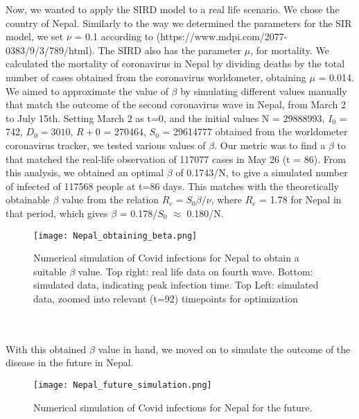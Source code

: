 \documentclass[11pt]{article}
\theoremstyle{definition}
\begin{document}
{Now, we wanted to apply the SIRD model to a real life scenario. We chose the country of Nepal. Similarly to the way we determined the parameters for the SIR model, we set $\nu$ = 0.1 according to (https://www.mdpi.com/2077-0383/9/3/789/html). The SIRD also has the parameter $\mu$, for mortality. We calculated the mortality of coronavirus in Nepal by dividing deaths by the total number of cases obtained from the coronavirus worldometer, obtaining $\mu$ = 0.014. We aimed to approximate the value of $\beta$ by simulating different values manually that match the outcome of the second coronavirus wave in Nepal, from March 2 to July 15th. Setting March 2 as t=0, and the initial values N = 29888993, $I_{0}$ = 742, $D_{0} = 3010$, $R+{0}$ = 270464, $S_{0}$ = 29614777 obtained from the worldometer coronavirus tracker, we tested various values of $\beta$. Our metric was to find a $\beta$ to that matched the real-life observation of 117077 cases in May 26 (t = 86). From this analysis, we obtained an optimal $\beta$ of 0.1743/N, to give a simulated number of infected of 117568 people at t=86 days. This matches with the theoretically obtainable $\beta$ value from the relation $R_{e} = S_{0}\beta/\nu$, where $R_{e}$ = 1.78 for Nepal in that period, which gives $\beta$ = 0.178/$S_{0}$ $\approx$ 0.180/N. 
\\

\begin{figure}[htp]
\centering
    \texttt{[image: Nepal\_obtaining\_beta.png]}
    \caption{Numerical simulation of Covid infections for Nepal to obtain a suitable $\beta$ value. Top right: real life data on fourth wave. Bottom: simulated data, indicating peak infection time. Top Left: simulated data, zoomed into relevant (t=92) timepoints for optimization}
\end{figure}\\
\\

With this obtained $\beta$ value in hand, we moved on to simulate the outcome of the disease in the future in Nepal. 

\begin{figure}[htp]
\centering
    \texttt{[image: Nepal\_future\_simulation.png]}
    \caption{Numerical simulation of Covid infections for Nepal for the future.}
\end{figure}


}
\end{document}
